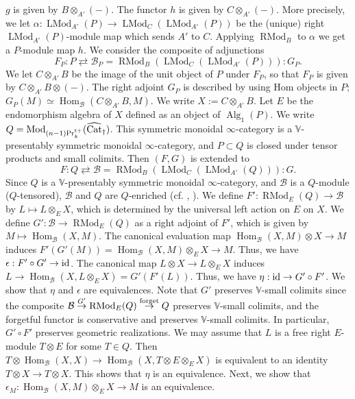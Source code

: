 \documentclass[leqno,12pt]{amsart}
\theoremstyle{plain}
\theoremstyle{definition}
\newcommand{\PRTT}{\textup{Pr}^{\textup{t}+}}
\newcommand{\Hom}{\operatorname{Hom}}
\newcommand{\Mod}{\operatorname{Mod}}
\newcommand{\Alg}{\operatorname{Alg}}
\newcommand{\vCat}{\widehat{\operatorname{Cat}}_\dagger}
\newcommand{\LMod}{\operatorname{LMod}}
\newcommand{\RMod}{\operatorname{RMod}}
\begin{document}
$g$ is given by $B\otimes_{A'}(-)$. 
The functor $h$ is given by $C\otimes_{A'}(-)$.
More precisely, we let $\alpha:\LMod_{A'}(P) \rightarrow\LMod_C(\LMod_{A'}(P))$
be the (unique) right $\LMod_{A'}(P)$-module map which sends $A'$ to $C$.
Applying $\RMod_B$ to $\alpha$ we get a $P$-module map $h$.
We consider the composite of adjunctions
\[
F_P:P\rightleftarrows \mathcal{B}_P=\RMod_{B}(\LMod_C(\LMod_{A'}(P))):G_P.
\]
We let $C\otimes_{A'}B$ be the image of the unit object of $P$ under $F_P$, so that
$F_P$ is given by $C\otimes_{A'}B\otimes (-)$.
The right adjoint $G_P$ is described by using 
Hom objects in $P$; $G_P(M)\simeq \Hom_{\mathcal{B}}(C\otimes_{A'}B,M)$. We write $X:=C\otimes_{A'}B$.
Let $E$ be the endomorphism algebra of $X$ defined as an object of $\Alg_1(P)$.
We write $Q=\Mod_{(n-1)\PRTT_k}(\vCat)$. This symmetric monoidal $\infty$-category is a $\mathbb{V}$-presentably symmetric monoidal $\infty$-category,
and $P\subset Q$ is closed under tensor products and small colimits.
Then $(F,G)$ is extended to
\[
F:Q\rightleftarrows \mathcal{B}=\RMod_{B}(\LMod_C(\LMod_{A'}(Q))):G.
\]
Since $Q$ is a $\mathbb{V}$-presentably symmetric monoidal $\infty$-category, and $\mathcal{B}$ is a $Q$-module ($Q$-tensored),
$\mathcal{B}$ and $Q$ are $Q$-enriched (cf. \cite[4.2.1]{HA}, \cite[7.4.13]{GH}). 
We define $F':\RMod_{E}(Q)\to \mathcal{B}$ by $L\mapsto L\otimes_EX$, which is determined by the universal left action on $E$ on $X$.
We define $G':\mathcal{B}\to \RMod_{E}(Q)$ as a right adjoint of $F'$, which is given by $M\mapsto\Hom_{\mathcal{B}}(X,M)$. 
The canonical evaluation map
$\Hom_{\mathcal{B}}(X,M)\otimes X\to M$
induces $F'(G'(M))=\Hom_{\mathcal{B}}(X,M)\otimes_EX\to M$.
Thus, we have $\epsilon:F'\circ G' \to \textup{id}$.
The canonical map $L\otimes X\to L\otimes_EX$
induces $L\to \Hom_{\mathcal{B}}(X,L\otimes_EX)=G'(F'(L))$.
Thus, we have $\eta:\textup{id}\to G'\circ F'$.
We show that $\eta$ and $\epsilon$
are equivalences.
Note that $G'$ preserves $\mathbb{V}$-small colimits since the composite
$\mathcal{B}\stackrel{G'}{\to} \RMod_{E}(Q)\stackrel{\textup{forget}}{\to} Q$
preserves $\mathbb{V}$-small colimits, and the forgetful functor is conservative and preserves $\mathbb{V}$-small colimits.
In particular, $G'\circ F'$ preserves geometric realizations. We may assume that $L$ is a free right $E$-module $T\otimes E$ for some $T\in Q$. Then
$T\otimes \Hom_{\mathcal{B}}(X,X)\to \Hom_{\mathcal{B}}(X,T\otimes E\otimes_EX)$ is equivalent to an identity $T\otimes X\to T\otimes X$.
This shows that $\eta$ is an equivalence. 
Next, we show that $\epsilon_M:\Hom_{\mathcal{B}}(X,M)\otimes_EX \to M$ is an equivalence.
\end{document}
